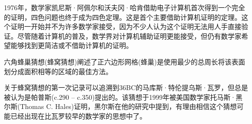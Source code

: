 1976年，数学家凯尼斯·阿佩尔和沃夫冈·哈肯借助电子计算机首次得到一个完全的证明，四色问题也终于成为四色定理。这是首个主要借助计算机证明的定理。这个证明一开始并不为许多数学家接受，因为不少人认为这个证明无法用人手直接验证。尽管随着计算机的普及，数学界对计算机辅助证明更能接受，但仍有数学家希望能够找到更简洁或不借助计算机的证明。


\begin{example}
  六角蜂巢猜想(蜂窝猜想)阐述了正六边形网格(蜂巢)是使用最少的总周长将该表面划分成面积相等的区域的最佳方法。
\end{example}

关于蜂窝猜想的第一次记录可以追溯到36BC的马库斯·特伦提乌斯·瓦罗，但总是被认为是帕普斯(c.290 – c.350)提出的。该猜想于1999年被美国数学家托马斯·黑尔斯(Thomas C. Hales)证明，黑尔斯在他的研究中提到，有理由相信这个猜想可能已经出现在比瓦罗较早的数学家的思想中了。
